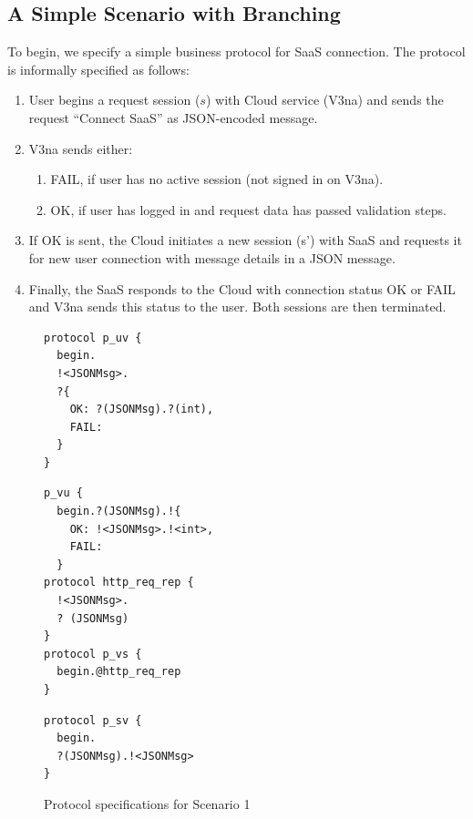 \documentclass[10pt]{llncs}
\begin{document}
\subsection{A Simple Scenario with Branching}
To begin, we specify a simple business protocol for SaaS connection. The protocol is informally specified as follows:
\begin{enumerate}
\item  User begins a request session ($s$) with Cloud service (V3na) and sends the request ``Connect SaaS'' as JSON-encoded message.
\item  V3na sends either:
\begin{enumerate}
\item  FAIL, if user has no active session (not signed in on V3na). %
\item  OK, if user has logged in and request data has passed validation steps. %
\end{enumerate}
\item  If OK is sent, the Cloud initiates a new session (s') with SaaS and requests it for new user connection with message details in a JSON message.
\item Finally, the SaaS responds to the Cloud with connection status OK or FAIL and V3na sends this status to the user. Both sessions are then terminated.
\end{enumerate}

%
{
\lstset{
  framerule=0pt,
  numbers=none,
  basicstyle=\ttfamily\scriptsize,
}
\renewcommand\lstlistingname{Protocol}
\begin{figure}

\begin{minipage}[t]{0.30\textwidth}
\begin{lstlisting}[caption=User]
protocol p_uv { 
  begin.
  !<JSONMsg>. 
  ?{
    OK: ?(JSONMsg).?(int),
    FAIL: 
  }
}
\end{lstlisting}
\end{minipage}
\begin{minipage}[t]{0.35\textwidth}
\begin{lstlisting}[caption=Cloud]
p_vu { 
  begin.?(JSONMsg).!{
    OK: !<JSONMsg>.!<int>,
    FAIL: 
  }
protocol http_req_rep {
  !<JSONMsg>.
  ? (JSONMsg)
}
protocol p_vs { 
  begin.@http_req_rep 
}
\end{lstlisting}
\end{minipage}
\begin{minipage}[t]{0.30\textwidth}
\begin{lstlisting}[caption=SaaS]
protocol p_sv { 
  begin.
  ?(JSONMsg).!<JSONMsg> 
}
\end{lstlisting}
\end{minipage}
\caption{Protocol specifications for Scenario 1}\label{fig:protocols-sc1} 
\end{figure}
}
\end{document}
